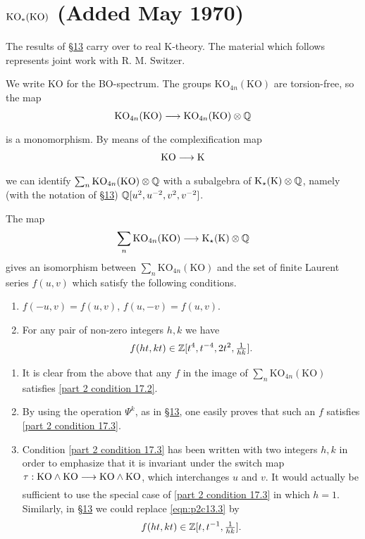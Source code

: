 \documentclass[../main]{subfiles}
\begin{document}
\chapter{\texorpdfstring{$\mathrm{KO}_\ast(\mathrm{KO})$}{KO(KO)} (Added May 1970)} %
\label{sec:p2c17}

The results of \hyperref[sec:p2c13]{\S13} carry over to real K-theory. The material which follows represents joint work with R. M. Switzer.

We write $\mathrm{KO}$ for the BO-spectrum. The groups $\mathrm{KO}_{4n}(\mathrm{KO})$ are torsion-free, so the map
\[
\mathrm{KO}_{4n}(\mathrm{KO})
\lar{}
\mathrm{KO}_{4n}(\mathrm{KO}) \otimes \bbQ %
\]
is a monomorphism. By means of the complexification map
\[
\mathrm{KO}\lar{} \mathrm K
\]
we can identify $\sum_n \mathrm{KO}_{4n}(\mathrm{KO}) \otimes \mathbb{Q}$ with a subalgebra of $\mathrm K_\star(\mathrm K) \otimes \mathbb{Q}$, namely (with the notation of \hyperref[sec:p2c13]{\S 13}) $\mathbb{Q}[u^2,u^{-2},v^2,v^{-2}]$.

\begin{theorem} \label{thm:p2c17.1}
The map
\[
\sum_n \mathrm{KO}_{4n}(\mathrm{KO})
\lar{}
\mathrm K_\star(\mathrm K) \otimes \bbQ
\]
gives an isomorphism between $\sum_n \mathrm{KO}_{4n}(\mathrm{KO})$ and the set of finite Laurent series $f(u,v)$ which satisfy the following conditions.
    \begin{enumerate}[label=(\thechapter.\arabic*), start=2]
        \item \label{part 2 condition 17.2}
        $f(-u,v)=f(u,v)$, $f(u,-v)=f(u,v)$.
        \item \label{part 2 condition 17.3}
        For any pair of non-zero integers $h,k$ we have
        \[
        f(ht,kt)\in \mathbb{Z}[t^4,t^{-4},2t^2, \tfrac{1}{hk}].
        \]
    \end{enumerate}
\end{theorem}

\begin{notes}
    \begin{enumerate}[label=(\thechapter.\arabic*), start=4]
        \item \label{part 2 note 17.4}
        It is clear from the above that any $f$ in the image of $\sum_n \mathrm{KO}_{4n}(\mathrm{KO})$ satisfies \ref{part 2 condition 17.2}.
        \item \label{part 2 note 17.5}
        By using the operation $\Psi^k$, as in \hyperref[sec:p2c13]{\S 13}, one easily proves that such an $f$ satisfies \ref{part 2 condition 17.3}.
        \item \label{part 2 note 17.6}
        Condition \ref{part 2 condition 17.3} has been written with two integers $h,k$ in order to emphasize that it is invariant under the switch map $\tau: \mathrm{KO}\wedge \mathrm{KO} \lar{} \mathrm{KO} \wedge \mathrm{KO}$, which interchanges $u$ and $v$. It would actually be sufficient to use the special case of \ref{part 2 condition 17.3} in which $h=1$. Similarly, in \hyperref[sec:p2c13]{\S 13} we could replace \eqref{eqn:p2c13.3} by
        \[
        f(ht,kt) \in \mathbb{Z}[t,t^{-1}, \tfrac{1}{hk}].
        \]
    \end{enumerate}
\end{notes}
\end{document}
